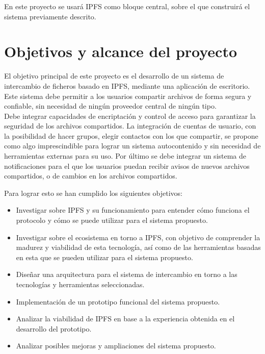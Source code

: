 En este proyecto se usará IPFS como bloque central, sobre el que construirá el sistema previamente descrito.


\section{Objetivos y alcance del proyecto}
El objetivo principal de este proyecto es el desarrollo de un sistema de intercambio de ficheros basado en IPFS, mediante una aplicación de escritorio.
Este sistema debe permitir a los usuarios compartir archivos de forma segura y confiable, sin necesidad de ningún proveedor
central de ningún tipo.
\\Debe integrar capacidades  de encriptación y control de acceso para garantizar la seguridad de los
archivos compartidos. La integración de cuentas de usuario, con la posibilidad de hacer grupos, elegir contactos con los que
compartir, se propone como algo imprescindible para lograr un sistema autocontenido y sin necesidad de herramientas externas
para su uso. Por último se debe integrar un sistema de notificaciones para el que los usuarios puedan recibir avisos de nuevos
archivos compartidos, o de cambios en los archivos compartidos.

Para lograr esto se han cumplido los siguientes objetivos:
\begin{itemize}

      \item Investigar sobre IPFS y su funcionamiento para entender cómo funciona el protocolo
            y cómo se puede utilizar para el sistema propuesto.
      \item Investigar sobre el ecosistema en torno a IPFS, con objetivo de comprender
            la madurez y viabilidad de esta tecnología, así como de las herramientas basadas en esta
            que se pueden utilizar para el sistema propuesto.
      \item Diseñar una arquitectura para el sistema de intercambio en torno a las tecnologías y herramientas seleccionadas.
      \item Implementación de un prototipo funcional del sistema propuesto.
      \item Analizar la viabilidad de IPFS en base a la experiencia obtenida en el desarrollo del prototipo.
      \item Analizar posibles mejoras y ampliaciones del sistema propuesto.

\end{itemize}

